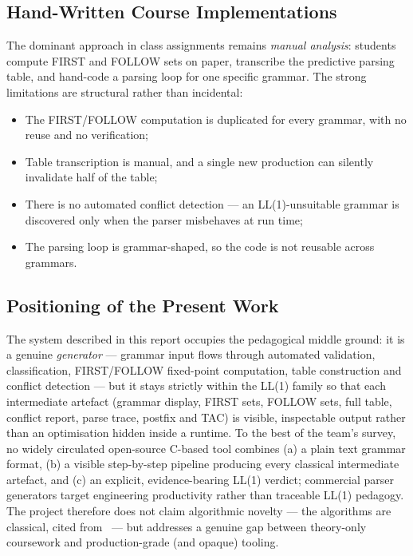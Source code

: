 \documentclass[12pt,a4paper,oneside,openany]{report}
\begin{document}
\subsection{Hand-Written Course Implementations}
The dominant approach in class assignments remains \emph{manual analysis}:
students compute FIRST and FOLLOW sets on paper, transcribe the predictive
parsing table, and hand-code a parsing loop for one specific grammar. The
strong limitations are structural rather than incidental:

\begin{itemize}
  \item The FIRST/FOLLOW computation is duplicated for every grammar, with
        no reuse and no verification;
  \item Table transcription is manual, and a single new production can
        silently invalidate half of the table;
  \item There is no automated conflict detection --- an LL(1)-unsuitable
        grammar is discovered only when the parser misbehaves at run time;
  \item The parsing loop is grammar-shaped, so the code is not reusable
        across grammars.
\end{itemize}

\subsection{Positioning of the Present Work}
The system described in this report occupies the pedagogical middle ground:
it is a genuine \emph{generator} --- grammar input flows through automated
validation, classification, FIRST/FOLLOW fixed-point computation, table
construction and conflict detection --- but it stays strictly within the
LL(1) family so that each intermediate artefact (grammar display, FIRST
sets, FOLLOW sets, full table, conflict report, parse trace, postfix and
TAC) is visible, inspectable output rather than an optimisation hidden
inside a runtime. To the best of the team's survey, no widely circulated
open-source C-based tool combines (a) a plain text grammar format, (b) a
visible step-by-step pipeline producing every classical intermediate
artefact, and (c) an explicit, evidence-bearing LL(1) verdict; commercial
parser generators target engineering productivity rather than traceable
LL(1) pedagogy. The project therefore does not claim algorithmic novelty
--- the algorithms are classical, cited from~\cite{aho2006compilers,
lewis1968} --- but addresses a genuine gap between theory-only coursework
and production-grade (and opaque) tooling.
\end{document}
